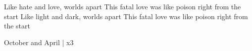 \documentclass[../../../songbook.tex]{subfiles}
\begin{document}
\-\hspace{0.8cm} Like hate and love,  worlds apart		\newline
\-\hspace{0.8cm} This fatal love was like poison right from the start		\newline
\-\hspace{0.8cm} Like light and dark, worlds apart		\newline
\-\hspace{0.8cm} This fatal love was like poison right from the start  		\newline       

October and April   | x3  \newline
\end{document}
